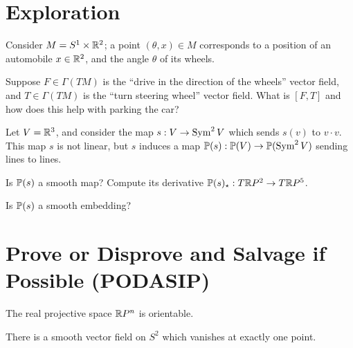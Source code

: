 \documentclass{homework}
\begin{document}
\section{Exploration}

\begin{problem}
  Consider $M = S^1 \times \mathbb{R}^2$; a point $(\theta,x) \in M$
  corresponds to a position of an automobile $x \in \mathbb{R}^2$, and the
  angle $\theta$ of its wheels.

  Suppose $F \in \Gamma(TM)$ is the ``drive in the direction of the
  wheels'' vector field, and $T \in \Gamma(TM)$ is the ``turn steering
  wheel'' vector field.  What is $[F,T]$ and how does this help with
  parking the car?
\end{problem}

\begin{problem}
  Let $V = \mathbb{R}^3$, and consider the map $s : V \to \operatorname{Sym}^2
  V$ which sends $s(v)$ to $v \cdot v$.  This map $s$ is not linear, but
  $s$ induces a map $\mathbb{P}(s) : \mathbb{P}(V) \to \mathbb{P}(\operatorname{Sym}^2 V)$ sending lines to lines.

  Is $\mathbb{P}(s)$ a smooth map?  Compute its derivative
  $\mathbb{P}(s)_\star : T\mathbb{R}P^2 \to T\mathbb{R}P^5$.

  Is $\mathbb{P}(s)$ a smooth embedding?
\end{problem}

\section{Prove or Disprove and Salvage if Possible (PODASIP)}

\begin{problem}
  The real projective space $\mathbb{R}P^n$ is orientable.
\end{problem}

\begin{problem}
  There is a smooth vector field on $S^2$ which vanishes at exactly one point.
\end{problem}
\end{document}
